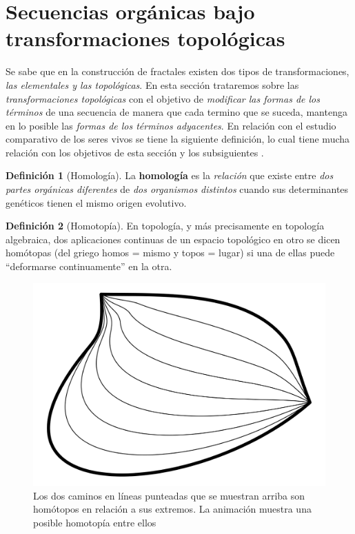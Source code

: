 \documentclass[
  11pt,
]{krantz}
\theoremstyle{definition}
\newtheorem{definition}{Definición}[chapter]
\theoremstyle{definition}
\theoremstyle{definition}
\theoremstyle{definition}
\theoremstyle{remark}
\begin{document}
\hypertarget{secuencias-orguxe1nicas-bajo-transformaciones-topoluxf3gicas}{%
\section{Secuencias orgánicas bajo transformaciones topológicas}\label{secuencias-orguxe1nicas-bajo-transformaciones-topoluxf3gicas}}

Se sabe que en la construcción de fractales existen dos tipos de transformaciones, \emph{las elementales y las topológicas}. En esta sección trataremos sobre las \emph{transformaciones topológicas} con el objetivo de \emph{modificar las formas de los términos} de una secuencia de manera que cada termino que se suceda, mantenga en lo posible las \emph{formas de los términos adyacentes}. En relación con el estudio comparativo de los seres vivos se tiene la siguiente definición, lo cual tiene mucha relación con los objetivos de esta sección y los subsiguientes \citet{homology}.

\begin{definition}[Homología]
\protect\hypertarget{def:homologia}{}\label{def:homologia}La \textbf{homología} es la \emph{relación} que existe entre \emph{dos partes orgánicas diferentes} de \emph{dos organismos distintos} cuando sus determinantes genéticos tienen el mismo origen evolutivo.
\end{definition}

\begin{definition}[Homotopía]
\protect\hypertarget{def:homotopia}{}\label{def:homotopia}En topología, y más precisamente en topología algebraica, dos aplicaciones continuas de un espacio topológico en otro se dicen homótopas (del griego homos = mismo y topos = lugar) si una de ellas puede ``deformarse continuamente'' en la otra.
\end{definition}

\begin{figure}[!ht]

{\centering \includegraphics[width=0.5\linewidth]{homotopia} 

}

\caption{Los dos caminos en líneas punteadas que se muestran arriba son homótopos en relación a sus extremos. La animación muestra una posible homotopía entre ellos}\label{fig:homotopia}
\end{figure}
\end{document}
